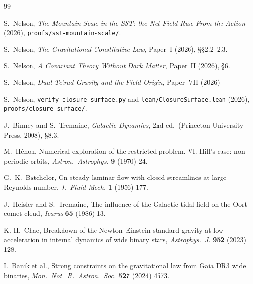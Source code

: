 \documentclass[twocolumn]{iopjournal}
\begin{document}

\begin{thebibliography}{99}

S.~Nelson, \textit{The Mountain Scale in the SST: the Net-Field Rule
From the Action} (2026), \texttt{proofs/sst-mountain-scale/}.

S.~Nelson, \textit{The Gravitational Constitutive Law}, Paper~I
(2026), \S\S2.2--2.3.

S.~Nelson, \textit{A Covariant Theory Without Dark Matter}, Paper~II
(2026), \S6.

S.~Nelson, \textit{Dual Tetrad Gravity and the Field Origin},
Paper~VII (2026).

S.~Nelson, \texttt{verify\_closure\_surface.py} and
\texttt{lean/ClosureSurface.lean} (2026),
\texttt{proofs/closure-surface/}.

J.~Binney and S.~Tremaine, \textit{Galactic Dynamics}, 2nd ed.\
(Princeton University Press, 2008), \S8.3.

M.~H\'enon, Numerical exploration of the restricted problem. VI. Hill's
case: non-periodic orbits, \textit{Astron.\ Astrophys.} \textbf{9}
(1970) 24.

G.~K.~Batchelor, On steady laminar flow with closed streamlines at large
Reynolds number, \textit{J.\ Fluid Mech.} \textbf{1} (1956) 177.

J.~Heisler and S.~Tremaine, The influence of the Galactic tidal field
on the Oort comet cloud, \textit{Icarus} \textbf{65} (1986) 13.

K.-H.~Chae, Breakdown of the Newton--Einstein standard gravity at low
acceleration in internal dynamics of wide binary stars,
\textit{Astrophys.\ J.} \textbf{952} (2023) 128.

I.~Banik et al., Strong constraints on the gravitational law from Gaia
DR3 wide binaries, \textit{Mon.\ Not.\ R.\ Astron.\ Soc.} \textbf{527}
(2024) 4573.

\end{thebibliography}
\end{document}
